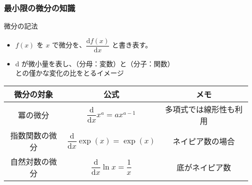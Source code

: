 \documentclass[12pt, dvipdfmx]{beamer}
\newcommand{\dd}[1]{\dfrac{\mathrm{d} #1}{\mathrm{d} x}}
\begin{document}
\begin{frame}
	\frametitle{最小限の微分の知識}
	\begin{exampleblock}{微分の記法}
		\begin{itemize}
			\item $f(x)$ を $x$ で微分を、$\dd{f(x)}$ と書き表す。
			\item \alert{d が微小量}を表し、（分母：変数）と（分子：関数）\\との\alert{僅かな変化の比}をとるイメージ
		\end{itemize}
	\end{exampleblock}
	\vspace{-3mm}
	\footnotesize
	\renewcommand{\arraystretch}{2}
	\begin{table}[tb]
		\begin{center}
			\begin{tabular}{|c|c|c|} \hline
				微分の対象		& 公式							& メモ \\ \hline \hline
				冪の微分		& $\dd{}x^a = ax^{a-1}$ 		&  多項式では線形性も利用\\ \hline
				指数関数の微分	& $\dd{}\exp(x) = \exp(x)$ 		&  ネイピア数の場合\\ \hline
				自然対数の微分	& $\dd{}\ln x = \dfrac{1}{x}$ 	& 底がネイピア数 \\ \hline
			\end{tabular}
		\end{center}
	\end{table}
	\renewcommand{\arraystretch}{1.}
\end{frame}
\end{document}
